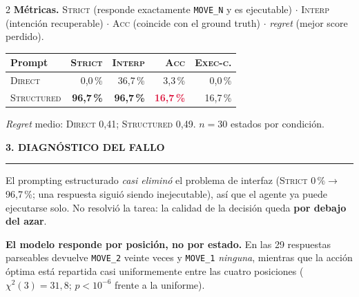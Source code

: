 \documentclass[9pt,a4paper]{extarticle}
\newcommand{\heading}[1]{%
  \par\vspace{1.1mm}\noindent
  {\color{navy}\bfseries\small\MakeUppercase{#1}}
  \par\vspace{0.7mm}\noindent
  {\color{amber}\rule{\linewidth}{1.1pt}}
  \par\vspace{0.6mm}\noindent\ignorespaces}
\begin{document}
\begin{multicols}{2}
\textbf{M\'etricas.} \textsc{Strict} (responde exactamente \texttt{MOVE\_N} y es ejecutable) $\cdot$ \textsc{Interp} (intenci\'on recuperable) $\cdot$ \textsc{Acc} (coincide con el ground truth) $\cdot$ \emph{regret} (mejor score perdido).

\vspace{0.8mm}
{\centering
\begin{tabular}{@{}lrrrr@{}}
\toprule
\textbf{Prompt} & \textsc{Strict} & \textsc{Interp} & \textsc{Acc} & \textsc{Exec-c.}\\
\midrule
\textsc{Direct}     & 0,0\,\%  & 36,7\,\% & 3,3\,\%  & 0,0\,\%\\
\textsc{Structured} & \textbf{96,7\,\%} & \textbf{96,7\,\%} & \textcolor{crimson}{\textbf{16,7\,\%}} & 16,7\,\%\\
\bottomrule
\end{tabular}\par}
\vspace{0.4mm}
{\footnotesize \emph{Regret} medio: \textsc{Direct} 0,41; \textsc{Structured} 0,49. $n=30$ estados por condici\'on.}

\heading{3. Diagn\'ostico del fallo}
El prompting estructurado \emph{casi elimin\'o} el problema de interfaz (\textsc{Strict} $0\,\%\rightarrow$ 96,7\,\%; una respuesta sigui\'o siendo inejecutable), as\'i que el agente ya puede ejecutarse solo. No resolvi\'o la tarea: la calidad de la decisi\'on queda \textbf{por debajo del azar}.

\textbf{El modelo responde por posici\'on, no por estado.} En las 29 respuestas parseables devuelve \texttt{MOVE\_2} veinte veces y \texttt{MOVE\_1} \emph{ninguna}, mientras que la acci\'on \'optima est\'a repartida casi uniformemente entre las cuatro posiciones ($\chi^2(3)=31{,}8$; $p<10^{-6}$ frente a la uniforme).

\vspace{0.5mm}
{\centering
{}\par}
\vspace{-0.5mm}


\end{multicols}
\end{document}
